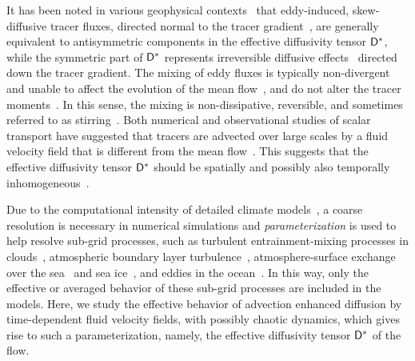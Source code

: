 \documentclass[amsa]{ipart}
\begin{document}
It has been noted in various geophysical
contexts~\cite{Plumb:JAS:1979,Plumb:JAS:1987} that eddy-induced,
skew-diffusive tracer fluxes, directed normal to the tracer
gradient~\cite{Middleton:JPO:5840223}, are generally equivalent to
antisymmetric components in the effective 
diffusivity tensor $\mathsf{D}^*$, while the symmetric part of $\mathsf{D}^*$
represents irreversible diffusive
effects~\cite{Redi:JPO:1982:1154,Solomon:OGR:1971:233,Griffies:JPO:1998}
directed down the tracer gradient. The mixing of eddy fluxes is
typically non-divergent and unable to affect the evolution of the mean
flow~\cite{Middleton:JPO:5840223}, and do not alter the tracer
moments~\cite{Griffies:JPO:1998}. In this sense, the 
mixing is non-dissipative, reversible, and sometimes referred to as
stirring~\cite{Eckart:JMR:1948,Griffies:JPO:1998}. Both numerical and
observational studies of scalar transport have suggested that tracers
are advected over large scales by a fluid velocity field that is
different from the mean flow~\cite{Pavliotis:PHD_Thesis}. This
suggests that the effective diffusivity tensor $\mathsf{D}^*$ should be
spatially and possibly also temporally
inhomogeneous~\cite{Pavliotis:PHD_Thesis}. 




Due to the computational intensity of detailed climate
models~\cite{Griffies:2003:10.1007,Washington:1986:9780935702521,Neelin:2010:CCCM},
a coarse resolution is necessary in numerical simulations and
\emph{parameterization} is used to help resolve sub-grid
processes, such as turbulent 
entrainment-mixing processes in clouds~\cite{Lu:JGR:D50094},
atmospheric boundary layer turbulence~\cite{Bretherton:JOC:5655449},
atmosphere-surface exchange over the
sea~\cite{Fairall:1996:JGRC6562} and sea
ice~\cite{Sorensen:TC:2014,Andreas:2010:QJ618,Andreas:JH:2010,Vihma:2014:9923},
and eddies in the ocean~\cite{McDougall:2001:book,Gent:JPO:1995}. In
this way, only the effective or averaged behavior of these sub-grid
processes are included in the models. Here, we study the effective
behavior of advection enhanced diffusion by time-dependent fluid
velocity fields, with possibly chaotic dynamics, which gives rise to
such a parameterization, namely, the effective diffusivity tensor
$\mathsf{D}^*$ of the flow. 
\end{document}
